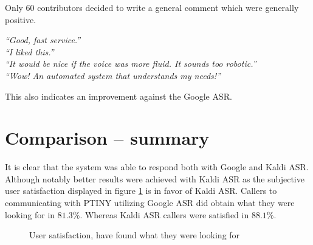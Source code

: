 Only 60 contributors decided to write a general comment which were generally positive.

\begin{flushleft}
\textit{``Good, fast service.''} \\
\textit{``I liked this.''} \\
\textit{``It would be nice if the voice was more fluid. It sounds too robotic.''} \\
\textit{``Wow! An automated system that understands my needs!''} \\
\end{flushleft}

\noindent This also indicates an improvement against the Google ASR.

\section{Comparison -- summary}

It is clear that the system was able to respond both with Google and Kaldi ASR.
Although notably better results were achieved with Kaldi ASR as the subjective user satisfaction displayed in figure \ref{fig:us} is in favor of Kaldi ASR.
Callers to communicating with PTINY utilizing Google ASR did obtain what they were looking for in $81.3\%$.
Whereas Kaldi ASR callers were satisfied in $88.1\%$.

\begin{figure}[ht]
\caption{User satisfaction, have found what they were looking for}
\label{fig:us}
\end{figure}


